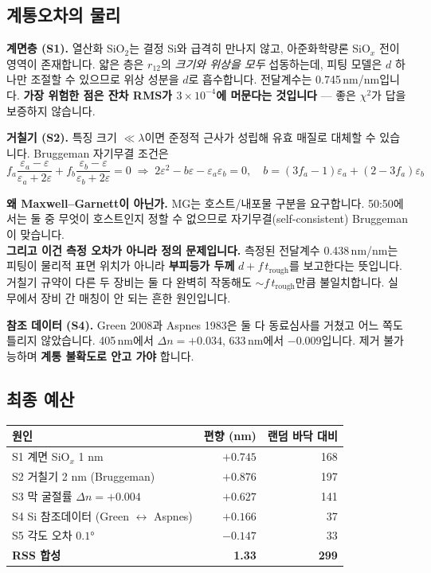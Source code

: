 \documentclass[10pt,a4paper]{article}
\newcommand{\note}[1]{%
  \begin{tcolorbox}[enhanced,breakable,colback=white,colframe=accent,
    boxrule=0pt,leftrule=1.6pt,arc=0pt,outer arc=0pt,
    left=6pt,right=2pt,top=3pt,bottom=3pt,boxsep=0pt,
    before skip=5pt, after skip=8pt]
  #1
  \end{tcolorbox}}
\begin{document}
\subsection{계통오차의 물리}

\textbf{계면층 (S1).} 열산화 SiO$_2$는 결정 Si와 급격히 만나지 않고, 아준화학량론 SiO$_x$ 전이 영역이 존재합니다. 얇은 층은 $r_{12}$의 \emph{크기와 위상을 모두} 섭동하는데, 피팅 모델은 $d$ 하나만 조절할 수 있으므로 위상 성분을 $d$로 흡수합니다. 전달계수는 0.745\,nm/nm입니다. \textbf{가장 위험한 점은 잔차 RMS가 $3\times10^{-4}$에 머문다는 것입니다} — 좋은 $\chi^2$가 답을 보증하지 않습니다.

\textbf{거칠기 (S2).} 특징 크기 $\ll\lambda$이면 준정적 근사가 성립해 유효 매질로 대체할 수 있습니다. Bruggeman 자기무결 조건은
\begin{equation}
f_a\frac{\varepsilon_a-\varepsilon}{\varepsilon_a+2\varepsilon}+f_b\frac{\varepsilon_b-\varepsilon}{\varepsilon_b+2\varepsilon}=0
\;\Longrightarrow\;
2\varepsilon^2-b\varepsilon-\varepsilon_a\varepsilon_b=0,\quad
b=(3f_a-1)\varepsilon_a+(2-3f_a)\varepsilon_b
\end{equation}

\note{\textbf{왜 Maxwell--Garnett이 아닌가.} MG는 호스트/내포물 구분을 요구합니다. 50:50에서는 둘 중 무엇이 호스트인지 정할 수 없으므로 자기무결(self-consistent) Bruggeman이 맞습니다.\\[4pt]
\textbf{그리고 이건 측정 오차가 아니라 정의 문제입니다.} 측정된 전달계수 0.438\,nm/nm는 피팅이 물리적 표면 위치가 아니라 \textbf{부피등가 두께} $d+f\,t_{\text{rough}}$를 보고한다는 뜻입니다. 거칠기 규약이 다른 두 장비는 둘 다 완벽히 작동해도 $\sim f\,t_{\text{rough}}$만큼 불일치합니다. 실무에서 장비 간 매칭이 안 되는 흔한 원인입니다.}

\textbf{참조 데이터 (S4).} Green 2008과 Aspnes 1983은 둘 다 동료심사를 거쳤고 어느 쪽도 틀리지 않았습니다. 405\,nm에서 $\Delta n=+0.034$, 633\,nm에서 $-0.009$입니다. 제거 불가능하며 \textbf{계통 불확도로 안고 가야} 합니다.

\subsection{최종 예산}

\begin{center}
\begin{tabular}{@{}lrr@{}}
\toprule
원인 & 편향 (nm) & 랜덤 바닥 대비 \\
\midrule
S1 계면 SiO$_x$ 1 nm & $+0.745$ & 168 \\
S2 거칠기 2 nm (Bruggeman) & $+0.876$ & 197 \\
S3 막 굴절률 $\Delta n=+0.004$ & $+0.627$ & 141 \\
S4 Si 참조데이터 (Green $\leftrightarrow$ Aspnes) & $+0.166$ & 37 \\
S5 각도 오차 $0.1°$ & $-0.147$ & 33 \\
\midrule
\textbf{RSS 합성} & \textbf{1.33} & \textbf{299} \\
\bottomrule
\end{tabular}
\end{center}
\end{document}

